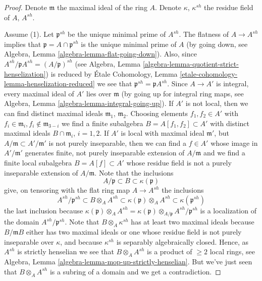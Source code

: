 \begin{proof}
Denote $\mathfrak m$ the maximal ideal of the ring $A$.
Denote $\kappa$, $\kappa^{sh}$ the residue field of $A$, $A^{sh}$.

\medskip\noindent
Assume (1). Let $\mathfrak p^{sh}$ be the unique minimal prime of
$A^{sh}$. The flatness of $A \to A^{sh}$ implies that
$\mathfrak p = A \cap \mathfrak p^{sh}$ is the unique minimal
prime of $A$ (by going down, see
Algebra, Lemma \ref{algebra-lemma-flat-going-down}).
Also, since $A^{sh}/\mathfrak pA^{sh} = (A/\mathfrak p)^{sh}$ (see
Algebra, Lemma \ref{algebra-lemma-quotient-strict-henselization})
is reduced by
\'Etale Cohomology, Lemma \ref{etale-cohomology-lemma-henselization-reduced}
we see that $\mathfrak p^{sh} = \mathfrak pA^{sh}$.
Since $A \to A'$ is integral, every maximal ideal of $A'$ lies over
$\mathfrak m$ (by going up for integral ring maps, see
Algebra, Lemma \ref{algebra-lemma-integral-going-up}).
If $A'$ is not local, then we can find distinct maximal ideals
$\mathfrak m_1$, $\mathfrak m_2$. Choosing elements $f_1, f_2 \in A'$
with $f_i \in \mathfrak m_i, f_i \not \in \mathfrak m_{3 - i}$ we find
a finite subalgebra $B = A[f_1, f_2] \subset A'$ with distinct maximal
ideals $B \cap \mathfrak m_i$, $i = 1, 2$. If $A'$ is local with maximal
ideal $\mathfrak m'$, but $A/\mathfrak m \subset A'/\mathfrak m'$
is not purely inseparable, then we can find a $f \in A'$ whose image in
$A'/\mathfrak m'$ generates finite, not purely inseparable extension
of $A/\mathfrak m$ and we find a finite local subalgebra $B = A[f] \subset A'$
whose residue field is not a purely inseparable extension of $A/\mathfrak m$.
Note that the inclusions
$$
A/\mathfrak p \subset B \subset \kappa(\mathfrak p)
$$
give, on tensoring with the flat ring map $A \to A^{sh}$ the inclusions
$$
A^{sh}/\mathfrak p^{sh} \subset
B \otimes_A A^{sh} \subset
\kappa(\mathfrak p) \otimes_A A^{sh} \subset
\kappa(\mathfrak p^{sh})
$$
the last inclusion because
$\kappa(\mathfrak p) \otimes_A A^{sh} =
\kappa(\mathfrak p) \otimes_{A/\mathfrak p} A^{sh}/\mathfrak p^{sh}$
is a localization of the domain $A^{sh}/\mathfrak p^{sh}$.
Note that $B \otimes_A \kappa^{sh}$ has at least two maximal ideals
because $B/\mathfrak mB$ either has two maximal ideals or one whose
residue field is not purely inseparable over $\kappa$, and because
$\kappa^{sh}$ is separably algebraically closed. Hence, as
$A^{sh}$ is strictly henselian we see that
$B \otimes_A A^{sh}$ is a product of $\geq 2$ local rings, see
Algebra, Lemma \ref{algebra-lemma-mop-up-strictly-henselian}.
But we've just seen that $B \otimes_A A^{sh}$ is a subring of a domain
and we get a contradiction.


\end{proof}
